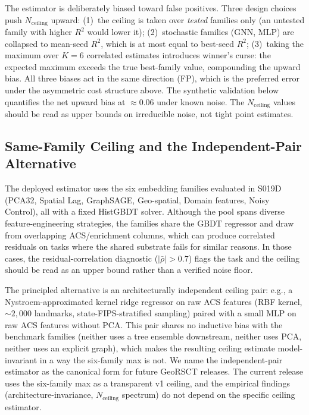 \documentclass{article}
\begin{document}
The estimator is deliberately biased toward false positives. Three design choices push $N_{\text{ceiling}}$ upward: (1)~the ceiling is taken over \emph{tested} families only (an untested family with higher $R^2$ would lower it); (2)~stochastic families (GNN, MLP) are collapsed to mean-seed $R^2$, which is at most equal to best-seed $R^2$; (3)~taking the maximum over $K{=}6$ correlated estimates introduces winner's curse: the expected maximum exceeds the true best-family value, compounding the upward bias. All three biases act in the same direction (FP), which is the preferred error under the asymmetric cost structure above. The synthetic validation below quantifies the net upward bias at ${\approx}0.06$ under known noise. The $N_{\text{ceiling}}$ values should be read as upper bounds on irreducible noise, not tight point estimates.

\subsection{Same-Family Ceiling and the Independent-Pair Alternative}

The deployed estimator uses the six embedding families evaluated in S019D (PCA32, Spatial Lag, GraphSAGE, Geo-spatial, Domain features, Noisy Control), all with a fixed HistGBDT solver. Although the pool spans diverse feature-engineering strategies, the families share the GBDT regressor and draw from overlapping ACS/enrichment columns, which can produce correlated residuals on tasks where the shared substrate fails for similar reasons. In those cases, the residual-correlation diagnostic ($|\bar\rho| > 0.7$) flags the task and the ceiling should be read as an upper bound rather than a verified noise floor.

The principled alternative is an architecturally independent ceiling pair: e.g., a Nystroem-approximated kernel ridge regressor on raw ACS features (RBF kernel, ${\sim}2{,}000$ landmarks, state-FIPS-stratified sampling) paired with a small MLP on raw ACS features without PCA. This pair shares no inductive bias with the benchmark families (neither uses a tree ensemble downstream, neither uses PCA, neither uses an explicit graph), which makes the resulting ceiling estimate model-invariant in a way the six-family max is not. We name the independent-pair estimator as the canonical form for future GeoRSCT releases. The current release uses the six-family max as a transparent v1 ceiling, and the empirical findings (architecture-invariance, $N_{\text{ceiling}}$ spectrum) do not depend on the specific ceiling estimator.
\end{document}
